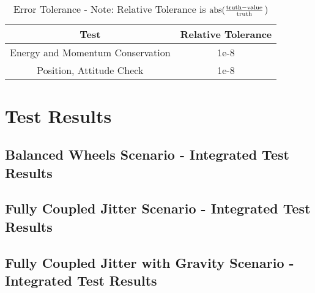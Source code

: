 \begin{table}[htbp]
	\caption{Error Tolerance - Note: Relative Tolerance is $\textnormal{abs}(\frac{\textnormal{truth} - \textnormal{value}}{\textnormal{truth}}$)}
	\label{tab:errortol}
	\centering \fontsize{10}{10}\selectfont
	\begin{tabular}{| c | c |} %
		\hline
		Test   & Relative Tolerance \\
		\hline
		Energy and Momentum Conservation & 1e-8 \\
		\hline
		Position, Attitude Check & 1e-8 \\
		\hline	
	\end{tabular}
\end{table}

\clearpage

\section{Test Results}

\subsection{Balanced Wheels Scenario - Integrated Test Results}






\clearpage

\subsection{Fully Coupled Jitter Scenario - Integrated Test Results}






\clearpage

\subsection{Fully Coupled Jitter with Gravity Scenario - Integrated Test Results}





